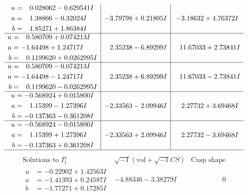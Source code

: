 \documentclass[1p]{elsarticle_modified}
\theoremstyle{definition}
\newcommand{\I}{\sqrt{-1}}
\begin{document}
$$\begin{array}{c|c|c}
\begin{aligned}
u &= \phantom{-}0.028062 - 0.629541 I \\
a &= \phantom{-}1.38866 - 0.32024 I \\
b &= \phantom{-}1.85271 + 1.86384 I\end{aligned}
 & -3.79798 + 0.21805 I & -3.18632 + 4.76372 I \\ \hline\begin{aligned}
u &= \phantom{-}0.580709 + 0.074213 I \\
a &= -1.64498 + 1.24717 I \\
b &= \phantom{-}0.1199620 + 0.0262995 I\end{aligned}
 & \phantom{-}2.35238 - 6.89299 I & \phantom{-}11.67033 + 2.73841 I \\ \hline\begin{aligned}
u &= \phantom{-}0.580709 - 0.074213 I \\
a &= -1.64498 - 1.24717 I \\
b &= \phantom{-}0.1199620 - 0.0262995 I\end{aligned}
 & \phantom{-}2.35238 + 6.89299 I & \phantom{-}11.67033 - 2.73841 I \\ \hline\begin{aligned}
u &= -0.568924 + 0.015800 I \\
a &= \phantom{-}1.15399 - 1.27396 I \\
b &= -0.137363 - 0.361208 I\end{aligned}
 & -2.33563 - 2.09946 I & \phantom{-}2.27732 + 3.69468 I \\ \hline\begin{aligned}
u &= -0.568924 - 0.015800 I \\
a &= \phantom{-}1.15399 + 1.27396 I \\
b &= -0.137363 + 0.361208 I\end{aligned}
 & -2.33563 + 2.09946 I & \phantom{-}2.27732 - 3.69468 I\\
 \hline 
 \end{array}$$\newpage$$\begin{array}{c|c|c}  
\text{Solutions to }I^u_{1}& \I (\text{vol} + \sqrt{-1}CS) & \text{Cusp shape}\\
 \hline 
\begin{aligned}
u &= -0.22902 + 1.42563 I \\
a &= -1.41393 + 0.24587 I \\
b &= -1.77271 + 0.17285 I\end{aligned}
 & -4.88346 - 3.38279 I & \phantom{-0.000000 } 0 \\ \hline\begin{aligned}

\end{aligned}
\end{array}$$
\end{document}
